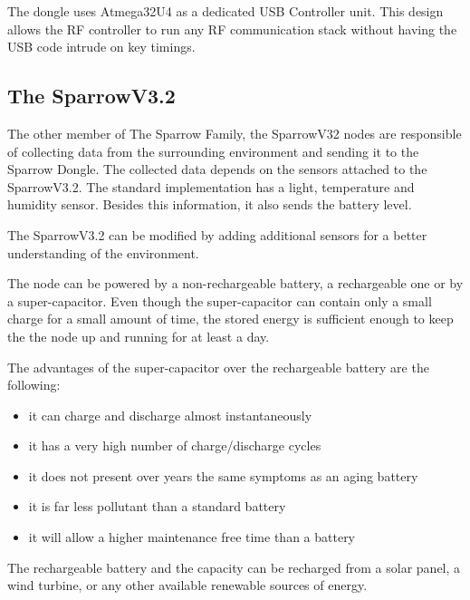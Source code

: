 The dongle uses Atmega32U4 as a dedicated USB Controller unit. This design allows the RF controller to run any RF communication stack without having the USB code intrude on key timings.\cite{voinescu2013lightweight}


\subsection{The SparrowV3.2}
 
 
The other member of The Sparrow Family, the SparrowV32 nodes are responsible of collecting data from the surrounding environment and sending it to the Sparrow Dongle. The collected data depends on the sensors attached to the SparrowV3.2. The standard implementation has a light, temperature and humidity sensor. Besides this information, it also sends the battery level.

The SparrowV3.2 can be modified by adding additional sensors for a better understanding of the environment.

The node can be powered by a non-rechargeable battery, a rechargeable one or by a super-capacitor. Even though the super-capacitor can contain only a small charge for a small amount of time, the stored energy is sufficient enough to keep the the node up and running for at least a day. 

The advantages of the super-capacitor over the rechargeable battery are the following:

\begin{itemize}
\item it can charge and discharge almost instantaneously 
\item it has a very high number of charge/discharge cycles 
\item it does not present over years the same symptoms as an aging battery
\item it is far less pollutant than a standard battery
\item it will allow a higher maintenance free time than a battery

\end{itemize}

The rechargeable battery and the capacity can be recharged from a solar panel, a wind turbine, or any other available renewable sources of energy.

